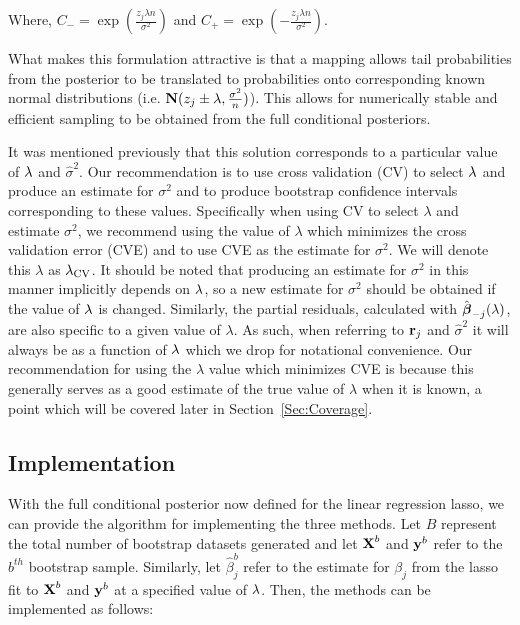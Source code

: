 Where, $C_{-} = \exp(\frac{z_j \lambda n}{\sigma^2})$ and $C_{+} = \exp(-\frac{z_j \lambda n}{\sigma^2})$.

What makes this formulation attractive is that a mapping allows tail probabilities from the posterior to be translated to probabilities onto corresponding known normal distributions (i.e. $\mathbf{N}(z_j \pm \lambda, \frac{\sigma^2}{n})$). This allows for numerically stable and efficient sampling to be obtained from the full conditional posteriors.

It was mentioned previously that this solution corresponds to a particular value of $\lambda$ and $\hat{\sigma}^2$. Our recommendation is to use cross validation (CV) to select $\lambda$ and produce an estimate for $\sigma^2$ and to produce bootstrap confidence intervals corresponding to these values. Specifically when using CV to select $\lambda$ and estimate $\sigma^2$, we recommend using the value of $\lambda$ which minimizes the cross validation error (CVE) and to use CVE as the estimate for $\sigma^2$. We will denote this $\lambda$ as $\lambda_{\textrm{CV}}$. It should be noted that producing an estimate for $\sigma^2$ in this manner implicitly depends on $\lambda$, so a new estimate for $\sigma^2$ should be obtained if the value of $\lambda$ is changed. Similarly, the partial residuals, calculated with $\hat{\boldsymbol{\beta}}_{-j}(\lambda)$, are also specific to a given value of $\lambda$. As such, when referring to $\mathbf{r}_{j}$ and $\hat{\sigma}^2$ it will always be as a function of $\lambda$ which we drop for notational convenience. Our recommendation for using the $\lambda$ value which minimizes CVE is because this generally serves as a good estimate of the true value of $\lambda$ when it is known, a point which  will be covered later in Section~\ref{Sec:Coverage}.

\subsection{Implementation}
\label{Sec:implementation}

With the full conditional posterior now defined for the linear regression lasso, we can provide the algorithm for implementing the three methods. Let $B$ represent the total number of bootstrap datasets generated and let $\boldsymbol{\mathbf{X}}^b$ and $\boldsymbol{\mathbf{y}}^{b}$ refer to the $b^{th}$ bootstrap sample. Similarly, let $\hat{\beta}^b_j$ refer to the estimate for $\beta_j$ from the lasso fit to $\boldsymbol{\mathbf{X}}^b$ and $\boldsymbol{\mathbf{y}}^b$ at a specified value of $\lambda$. Then, the methods can be implemented as follows:


